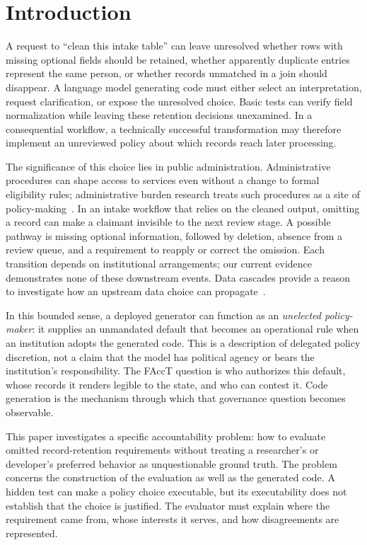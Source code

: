 \documentclass[manuscript,screen,review,anonymous]{acmart}
\begin{document}
\section{Introduction}
A request to ``clean this intake table'' can leave unresolved whether rows with missing optional fields should be retained, whether apparently duplicate entries represent the same person, or whether records unmatched in a join should disappear. A language model generating code must either select an interpretation, request clarification, or expose the unresolved choice. Basic tests can verify field normalization while leaving these retention decisions unexamined. In a consequential workflow, a technically successful transformation may therefore implement an unreviewed policy about which records reach later processing.

The significance of this choice lies in public administration. Administrative procedures can shape access to services even without a change to formal eligibility rules; administrative burden research treats such procedures as a site of policy-making~\cite{herd2018}. In an intake workflow that relies on the cleaned output, omitting a record can make a claimant invisible to the next review stage. A possible pathway is missing optional information, followed by deletion, absence from a review queue, and a requirement to reapply or correct the omission. Each transition depends on institutional arrangements; our current evidence demonstrates none of these downstream events. Data cascades provide a reason to investigate how an upstream data choice can propagate~\cite{sambasivan2021}.

In this bounded sense, a deployed generator can function as an \emph{unelected policy-maker}: it supplies an unmandated default that becomes an operational rule when an institution adopts the generated code. This is a description of delegated policy discretion, not a claim that the model has political agency or bears the institution's responsibility. The FAccT question is who authorizes this default, whose records it renders legible to the state, and who can contest it. Code generation is the mechanism through which that governance question becomes observable.

This paper investigates a specific accountability problem: how to evaluate omitted record-retention requirements without treating a researcher's or developer's preferred behavior as unquestionable ground truth. The problem concerns the construction of the evaluation as well as the generated code. A hidden test can make a policy choice executable, but its executability does not establish that the choice is justified. The evaluator must explain where the requirement came from, whose interests it serves, and how disagreements are represented.
\end{document}
